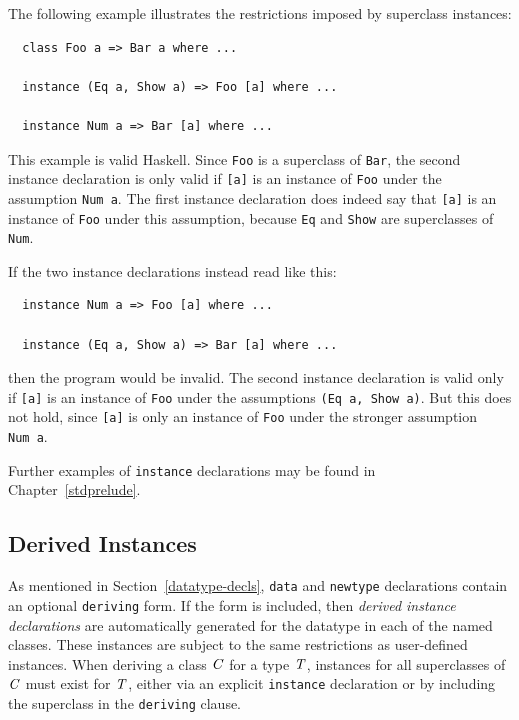 The following example illustrates the restrictions imposed by superclass instances:
\bprog
{\small\begin{verbatim}
  class Foo a => Bar a where ...
  
  instance (Eq a, Show a) => Foo [a] where ...
  
  instance Num a => Bar [a] where ...
\end{verbatim}}
\eprog
This example is valid Haskell.  Since \mbox{\tt Foo} is a superclass of \mbox{\tt Bar},
the second instance declaration is only valid if \mbox{\tt [a]} is an
instance of \mbox{\tt Foo} under the assumption \mbox{\tt Num\ a}.  
The first instance declaration does indeed say that \mbox{\tt [a]} is an instance
of \mbox{\tt Foo} under this assumption, because \mbox{\tt Eq} and \mbox{\tt Show} are superclasses
of \mbox{\tt Num}.

If the two instance declarations instead read like this:
\bprog
{\small\begin{verbatim}
  instance Num a => Foo [a] where ...
  
  instance (Eq a, Show a) => Bar [a] where ...
\end{verbatim}}
\eprog
then the program would be invalid.  The second instance declaration is
valid only if \mbox{\tt [a]} is an instance of \mbox{\tt Foo} under the assumptions
\mbox{\tt (Eq\ a,\ Show\ a)}.  But this does not hold, since \mbox{\tt [a]} is only an
instance of \mbox{\tt Foo} under the stronger assumption \mbox{\tt Num\ a}.

Further examples of 
\mbox{\tt instance} declarations may be found in Chapter~\ref{stdprelude}.

\subsection{Derived Instances}
\label{derived-decls}

As mentioned in Section~\ref{datatype-decls}, \mbox{\tt data} and \mbox{\tt newtype}
declarations 
contain an optional \mbox{\tt deriving} form.  If the form is included, then
{\em derived instance declarations} are automatically generated for
the datatype in each of the named classes.
These instances are subject to the same restrictions as user-defined
instances.  When deriving a class \mbox{$\it C$} for a type \mbox{$\it T$}, instances for
all superclasses of \mbox{$\it C$} must exist for \mbox{$\it T$}, either via an explicit
\mbox{\tt instance} declaration or by including the superclass in the
\mbox{\tt deriving} clause.

